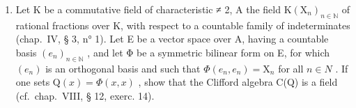 \begin{enumerate}
\def\labelenumi{\arabic{enumi})}
\setcounter{enumi}{16}
\tightlist
\item
  Let K be a commutative field of characteristic ≠ 2, A the field \(\mathrm{K}(\mathrm{X}_{n})_{n\in\mathbb{N}}\) of rational fractions over K, with respect to a countable family of indeterminates (chap.~IV, § 3, n° 1). Let E be a vector space over A, having a countable basis \((e_{n})_{n\in\mathbb{N}}\) , and let Φ be a symmetric bilinear form on E, for which \((e_{n})\) is an orthogonal basis and such that \(\Phi(e_{n}, e_{n}) = \mathrm{X}_{n}\) for all \(n \in N\) . If one sets \(\mathrm{Q}(x) = \Phi(x, x)\) , show that the Clifford algebra C(Q) is a field (cf.~chap.~VIII, § 12, exerc. 14).
\end{enumerate}

